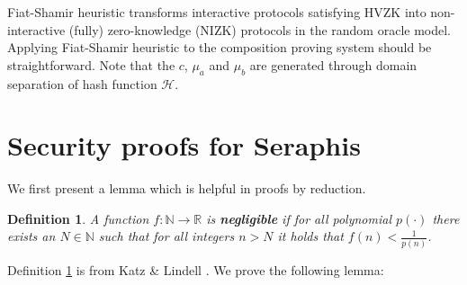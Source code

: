 \documentclass{article}
\newtheorem{definition}{Definition}[section]
\begin{document}
Fiat-Shamir heuristic transforms interactive protocols satisfying HVZK into non-interactive (fully) zero-knowledge (NIZK) protocols in the random oracle model. Applying Fiat-Shamir heuristic to the composition proving system should be straightforward. Note that the $c$, $\mu_a$ and $\mu_b$ are generated through domain separation of hash function $\mathcal{H}$.

\section{Security proofs for Seraphis}\label{proofs}
We first present a lemma which is helpful in proofs by reduction.

\begin{definition}\label{negl}
A function $f:\mathbb{N}\rightarrow\mathbb{R}$ is \textbf{\em negligible} if for all polynomial $p(\cdot)$ there exists an $N\in\mathbb{N}$ such that for all integers $n>N$ it holds that $f(n)<\frac{1}{p(n)}$.
\end{definition}
\noindent Definition \ref{negl} is from Katz \& Lindell \cite{katz-lindell}. We prove the following lemma:
\end{document}
